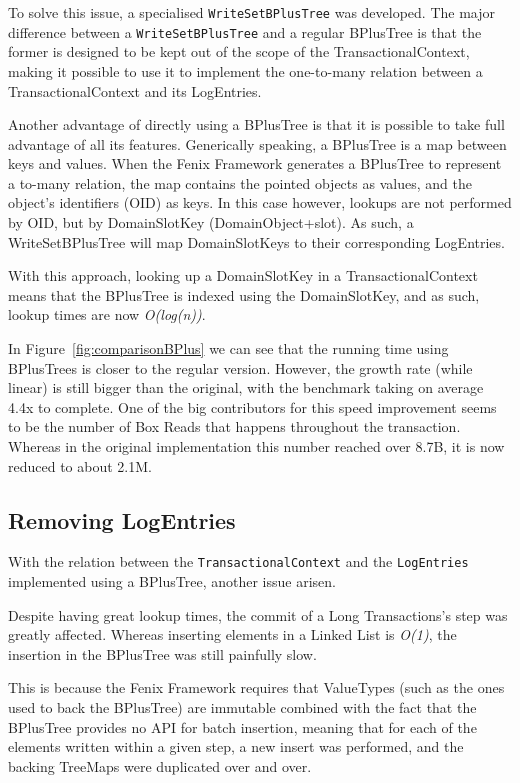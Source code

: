 \documentclass{llncs}
\begin{document}
To solve this issue, a specialised \texttt{WriteSetBPlusTree} was
developed. The major difference between a \texttt{WriteSetBPlusTree}
and a regular BPlusTree is that the former is designed to be kept out
of the scope of the TransactionalContext, making it possible to use it
to implement the one-to-many relation between a TransactionalContext
and its LogEntries.

Another advantage of directly using a BPlusTree is that it is possible
to take full advantage of all its features. Generically speaking, a
BPlusTree is a map between keys and values. When the Fenix Framework
generates a BPlusTree to represent a to-many relation, the map
contains the pointed objects as values, and the object's identifiers
(OID) as keys. In this case however, lookups are not performed by OID,
but by DomainSlotKey (DomainObject+slot). As such, a WriteSetBPlusTree
will map DomainSlotKeys to their corresponding LogEntries.

With this approach, looking up a DomainSlotKey in a
TransactionalContext means that the BPlusTree is indexed using the
DomainSlotKey, and as such, lookup times are now {\it O(log(n))}.

In Figure~\ref{fig:comparisonBPlus} we can
see that the running time using BPlusTrees is closer to the regular
version. However, the growth rate (while linear) is still bigger than
the original, with the benchmark taking on average 4.4x to
complete. One of the big contributors for this speed improvement seems
to be the number of Box Reads that happens throughout the
transaction. Whereas in the original implementation this number
reached over 8.7B, it is now reduced to about 2.1M.



\subsection{Removing LogEntries}

With the relation between the \texttt{TransactionalContext} and the
\texttt{LogEntries} implemented using a BPlusTree, another issue
arisen.

Despite having great lookup times, the commit of a Long Transactions's
step was greatly affected. Whereas inserting elements in a Linked List
is {\it O(1)}, the insertion in the BPlusTree was still painfully
slow.

This is because the Fenix Framework requires that ValueTypes (such as
the ones used to back the BPlusTree) are immutable combined with the
fact that the BPlusTree provides no API for batch insertion, meaning
that for each of the elements written within a given step, a new
insert was performed, and the backing TreeMaps were duplicated over
and over. 
\end{document}
